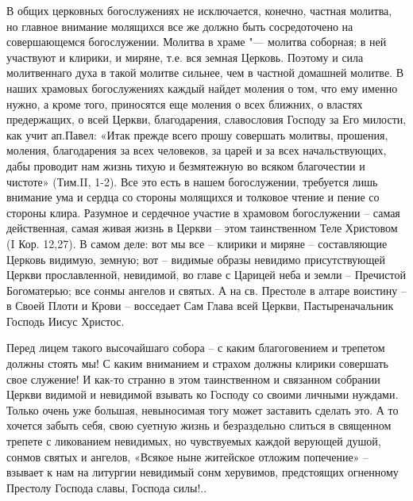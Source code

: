 


\mychapterending

 


В общих церковных богослужениях не исключается, конечно, частная молитва, но главное внимание молящихся все же должно быть сосредоточено на совершающемся богослужении. Молитва в храме "--- молитва соборная; в ней участвуют и клирики, и миряне, т.е. вся земная Церковь. Поэтому и сила молитвеннаго духа в такой молитве сильнее, чем в частной домашней молитве. В наших храмовых богослужениях каждый найдет моления о том, что ему именно нужно, а кроме того, приносятся еще моления о всех ближних, о властях предержащих, о всей Церкви, благодарения, славословия Господу за Его милости, как учит ап.Павел: «Итак прежде всего прошу совершать молитвы, прошения, моления, благодарения за всех человеков, за царей и за всех начальствующих, дабы проводит нам жизнь тихую и безмятежную во всяком благочестии и чистоте» (Тим.II, 1-2). Все это есть в нашем богослужении, требуется лишь внимание ума и сердца со стороны молящихся и толковое чтение и пение со стороны клира. Разумное и сердечное участие в храмовом богослужении – самая действенная, самая живая жизнь в Церкви – этом таинственном Теле Христовом (I Кор. 12,27). В самом деле: вот мы все – клирики и миряне – составляющие Церковь видимую, земную; вот – видимые образы невидимо присутствующей Церкви прославленной, невидимой, во главе с Царицей неба и земли – Пречистой Богоматерью; все сонмы ангелов и святых. А на св. Престоле в алтаре воистину – в Своей Плоти и Крови – восседает Сам Глава всей Церкви, Пастыреначальник Господь Иисус Христос.

Перед лицем такого высочайшаго собора – с каким благоговением и трепетом должны стоять мы! С каким вниманием и страхом должны клирики совершать свое служение! И как-то странно в этом таинственном и связанном собрании Церкви видимой и невидимой взывать ко Господу со своими личными нуждами. Только очень уже большая, невыносимая тогу может заставить сделать это. А то хочется забыть себя, свою суетную жизнь и безраздельно слиться в священном трепете с ликованием невидимых, но чувствуемых каждой верующей душой, сонмов святых и ангелов, «Всякое ныне житейское отложим попечение» – взывает к нам на литургии невидимый сонм херувимов, предстоящих огненному Престолу Господа славы, Господа силы!..

